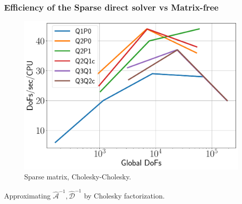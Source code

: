 \documentclass{beamer}
\begin{document}
\begin{frame}
	\frametitle{Efficiency of the Sparse direct solver vs Matrix-free}
	\begin{figure}[h]
		\center\includegraphics[width=.8\textwidth]{../figs/efficiency-chol-chol.pdf}
		\caption*{Sparse matrix, Cholesky-Cholesky.}
	\end{figure}	
	\alert{Approximating $\mathcal{\hat A}^{-1}, \mathcal{\hat D}^{-1}$ by Cholesky factorization.}
\end{frame}
\end{document}
